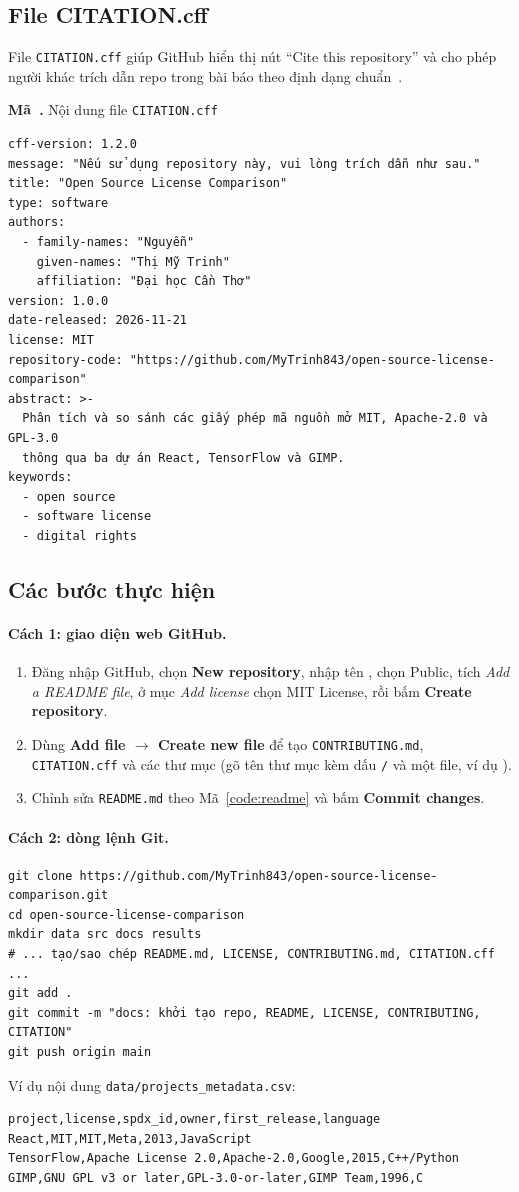 \documentclass[12pt,a4paper]{article}
\newcounter{code}
\newcommand{\codecap}[2]{\refstepcounter{code}\label{#2}\par\vspace{4pt}\noindent\textbf{Mã~\thecode.} #1\par\nopagebreak\vspace{2pt}}
\newcommand{\fn}[1]{\texttt{#1}}
\begin{document}
\subsection{File CITATION.cff}\label{sec:cff}
File \fn{CITATION.cff} giúp GitHub hiển thị nút ``Cite this repository'' và cho phép người khác trích dẫn repo trong bài báo theo định dạng chuẩn~\cite{cff,ghdocs}.

\codecap{Nội dung file \fn{CITATION.cff}}{code:cff}
\begin{Verbatim}
cff-version: 1.2.0
message: "Nếu sử dụng repository này, vui lòng trích dẫn như sau."
title: "Open Source License Comparison"
type: software
authors:
  - family-names: "Nguyễn"
    given-names: "Thị Mỹ Trinh"
    affiliation: "Đại học Cần Thơ"
version: 1.0.0
date-released: 2026-11-21
license: MIT
repository-code: "https://github.com/MyTrinh843/open-source-license-comparison"
abstract: >-
  Phân tích và so sánh các giấy phép mã nguồn mở MIT, Apache-2.0 và GPL-3.0
  thông qua ba dự án React, TensorFlow và GIMP.
keywords:
  - open source
  - software license
  - digital rights
\end{Verbatim}

\subsection{Các bước thực hiện}
\paragraph{Cách 1: giao diện web GitHub.}
\begin{enumerate}
  \item Đăng nhập GitHub, chọn \textbf{New repository}, nhập tên , chọn Public, tích \emph{Add a README file}, ở mục \emph{Add license} chọn MIT License, rồi bấm \textbf{Create repository}.
  \item Dùng \textbf{Add file $\rightarrow$ Create new file} để tạo \fn{CONTRIBUTING.md}, \fn{CITATION.cff} và các thư mục (gõ tên thư mục kèm dấu \texttt{/} và một file, ví dụ ).
  \item Chỉnh sửa \fn{README.md} theo Mã~\ref{code:readme} và bấm \textbf{Commit changes}.
\end{enumerate}
\paragraph{Cách 2: dòng lệnh Git.}
\begin{Verbatim}
git clone https://github.com/MyTrinh843/open-source-license-comparison.git
cd open-source-license-comparison
mkdir data src docs results
# ... tạo/sao chép README.md, LICENSE, CONTRIBUTING.md, CITATION.cff ...
git add .
git commit -m "docs: khởi tạo repo, README, LICENSE, CONTRIBUTING, CITATION"
git push origin main
\end{Verbatim}
Ví dụ nội dung \fn{data/projects\_metadata.csv}:
\begin{Verbatim}
project,license,spdx_id,owner,first_release,language
React,MIT,MIT,Meta,2013,JavaScript
TensorFlow,Apache License 2.0,Apache-2.0,Google,2015,C++/Python
GIMP,GNU GPL v3 or later,GPL-3.0-or-later,GIMP Team,1996,C
\end{Verbatim}
\end{document}

